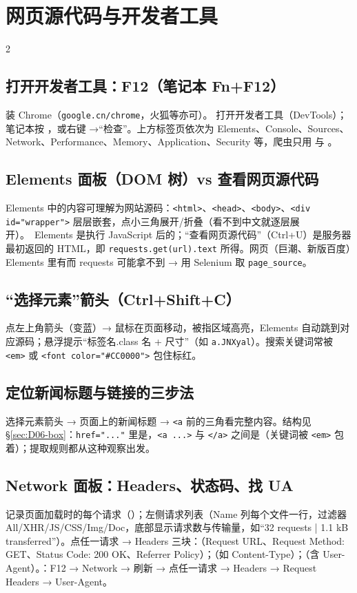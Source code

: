\section{网页源代码与开发者工具}
\begin{multicols}{2}\raggedcolumns\sloppy
\subsection{打开开发者工具：F12（笔记本 Fn+F12）}
装 Chrome（\texttt{google.cn/chrome}，火狐等亦可）。 打开开发者工具（DevTools）；笔记本按 ，或右键 →“检查”。上方标签页依次为 Elements、Console、Sources、Network、Performance、Memory、Application、Security 等，爬虫只用  与 。

\subsection{Elements 面板（DOM 树）vs 查看网页源代码}
Elements 中的内容可理解为网站源码：\texttt{<html>}、\texttt{<head>}、\texttt{<body>}、\texttt{<div id="wrapper">} 层层嵌套，点小三角展开/折叠（看不到中文就逐层展开）。\tagext\ Elements 是执行 JavaScript 后的；“查看网页源代码”（Ctrl+U）是服务器最初返回的 HTML，即 \texttt{requests.get(url).text} 所得。网页（巨潮、新版百度）Elements 里有而 requests 可能拿不到 → 用 Selenium 取 \texttt{page\_source}。

\subsection{“选择元素”箭头（Ctrl+Shift+C）}
点左上角箭头（变蓝）→ 鼠标在页面移动，被指区域高亮，Elements 自动跳到对应源码；悬浮提示“标签名.class 名 + 尺寸”（如 \texttt{a.JNXyal}）。搜索关键词常被 \texttt{<em>} 或 \texttt{<font color="\#CC0000">} 包住标红。

\subsection{定位新闻标题与链接的三步法}
选择元素箭头 → 页面上的新闻标题 →  \texttt{<a} 前的三角看完整内容。结构见 §\ref{sec:D06-box}：\texttt{href="..."} 里是，\texttt{<a ...>} 与 \texttt{</a>} 之间是（关键词被 \texttt{<em>} 包着）；提取规则都从这种观察出发。

\subsection{Network 面板：Headers、状态码、找 UA}
记录页面加载时的每个请求（）；左侧请求列表（Name 列每个文件一行，过滤器 All/XHR/JS/CSS/Img/Doc，底部显示请求数与传输量，如“32 requests | 1.1 kB transferred”）。点任一请求 → Headers 三块：（Request URL、Request Method: GET、Status Code: 200 OK、Referrer Policy）；（如 Content-Type）；（含 User-Agent）。：F12 → Network → 刷新 → 点任一请求 → Headers → Request Headers → User-Agent。
\end{multicols}

